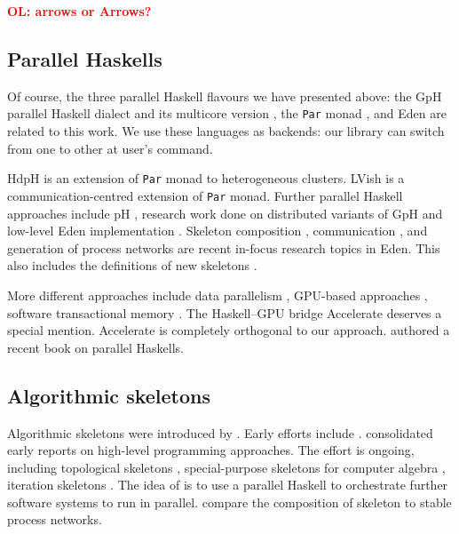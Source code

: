 \documentclass{jfp1}
\renewcommand{\cite}[1]{\citep{#1}}
\newcommand{\inlinecode}[1]{\texttt{#1}}
\newcommand{\comm}[2]{\textcolor{red}{\bfseries #1: #2}}
\newcommand{\olcomment}[1]{\comm{OL}{#1}}
\begin{document}
\olcomment{arrows or Arrows?}

\subsection{Parallel Haskells}
Of course, the three parallel Haskell flavours we have presented above: the GpH \cite{Trinder1998a,Trinder1999} parallel Haskell dialect and its multicore version \cite{Marlow2009}, the \inlinecode{Par} monad \cite{par-monad,Foltzer:2012:MPC:2398856.2364562}, and Eden \cite{eden,Loogen2012} are related to this work. We use these languages as backends: our library can switch from one to other at user's command.

HdpH \cite{Maier:2014:HDS:2775050.2633363,stewart_maier_trinder_2016} is an extension of \inlinecode{Par} monad to heterogeneous clusters. LVish \cite{Kuper:2014:TPE:2666356.2594312} is a communication-centred extension of \inlinecode{Par} monad.
%
Further parallel Haskell approaches include pH \cite{ph-book}, research work done on distributed variants of GpH \cite{Trinder1996,Aljabri:2013:DIG:2620678.2620682,Aljabri2015} and low-level Eden implementation \cite{JostThesis,berthold_loidl_hammond_2016}. Skeleton composition \cite{dieterle_horstmeyer_loogen_berthold_2016}, communication \cite{Dieterle2010}, and generation of process networks \cite{Horstmeyer2013} are recent in-focus research topics in Eden. This also includes the definitions of new skeletons \cite{doi:10.1142/S0129626403001380,Eden:PARCO05,Berthold2009-mr,Berthold2009-fft,brown2010ever,dieterle2010skeleton,delaEncina2011,Dieterle2013}.

More different approaches include data parallelism \cite{Chakravarty2007,Keller:2010:RSP:1932681.1863582,}, GPU-based approaches \cite{Mainland:2010:NEC:2088456.1863533,obsidian-phd}, software transactional memory \cite{Harris:2005:CMT:1065944.1065952,Perfumo:2008:LST:1366230.1366241}.
%
The Haskell--GPU bridge Accelerate \cite{Chakravarty:2011:AHA:1926354.1926358,CMCK14,McDonell:2015:TRC:2887747.2804313} deserves a special mention. Accelerate is completely orthogonal to our approach. \citeauthor{marlow2013parallel} authored a recent book \citeyear{marlow2013parallel} on parallel Haskells.

\subsection{Algorithmic skeletons}

Algorithmic skeletons were introduced by \citet{Cole1989}.
Early efforts include \cite{darlington1993parallel,botorog1996efficient,p3l97,Gorlatch1998,Lengauer1997}. \citet{SkeletonBook} consolidated early reports on high-level programming approaches.
The effort is ongoing, including topological skeletons \cite{Eden:PARCO05}, special-purpose skeletons for computer algebra \cite{Berthold2009-fft,brown2010ever,lobachev-phd,Lobachev2012}, iteration skeletons \cite{Dieterle2013}. The idea of \citet{scscp} is to use a parallel Haskell to orchestrate further software systems to run in parallel. \citet{dieterle_horstmeyer_loogen_berthold_2016} compare the composition of skeleton to stable process networks.
\end{document}
